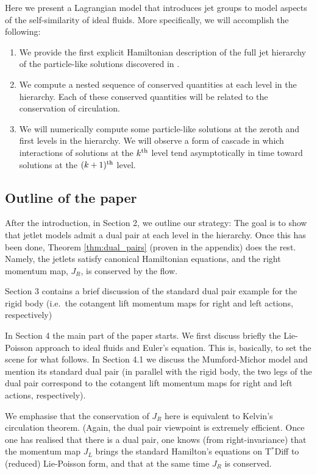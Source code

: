 \documentclass[12pt]{amsart}
\begin{document}
  Here we present a Lagrangian model that introduces jet groups to model aspects
  of the self-similarity of ideal fluids.
More specifically, we will accomplish the following:
\begin{enumerate}
  \item We provide the first explicit Hamiltonian description of the full jet hierarchy of the particle-like solutions discovered in 
  	\cite{JacobsRatiuDesbrun2013,CotterHolmJacobsMeier2014}.
  \item We compute a nested sequence of conserved quantities at 
    each level in the hierarchy.
    Each of these conserved quantities will be related to the conservation
    of circulation.
  \item We will numerically compute some particle-like solutions at the zeroth and first levels in the hierarchy.  We will observe a form of cascade in which interactions of solutions at the $k^{\rm th}$ level tend asymptotically in time toward solutions at the $(k+1)^{\rm th}$ level.
\end{enumerate}

\subsection{Outline of the paper}
After the introduction, in Section 2, we outline our strategy: The goal is to show that jetlet models admit a dual pair at each level in the hierarchy. Once this has been done, Theorem \ref{thm:dual_pairs} (proven in the appendix) does the rest. Namely, the jetlets satisfy canonical Hamiltonian equations, and the right momentum map, $J_R$, is conserved by the flow.

Section 3 contains a brief discussion of the standard dual pair example for the rigid body (i.e.\ the cotangent lift momentum maps for right and left actions, respectively)

In Section 4 the main part of the paper starts. We first discuss briefly the Lie-Poisson approach to ideal fluids and Euler's equation. This is, basically, to set the scene for what follows. In Section 4.1 we discuss the Mumford-Michor model and mention its standard dual pair (in parallel with the rigid body, the two legs of the dual pair correspond to the cotangent lift momentum maps for right and left actions, respectively). 

We emphasise that the conservation of $J_R$ here is equivalent to Kelvin's circulation theorem. (Again, the dual pair viewpoint is extremely efficient. Once one has realised that there is a dual pair, one knows (from right-invariance) that the momentum map $J_L$ brings the standard Hamilton's equations on T$^*$Diff to (reduced) Lie-Poisson form, and that at the same time $J_R$  is conserved.
\end{document}
